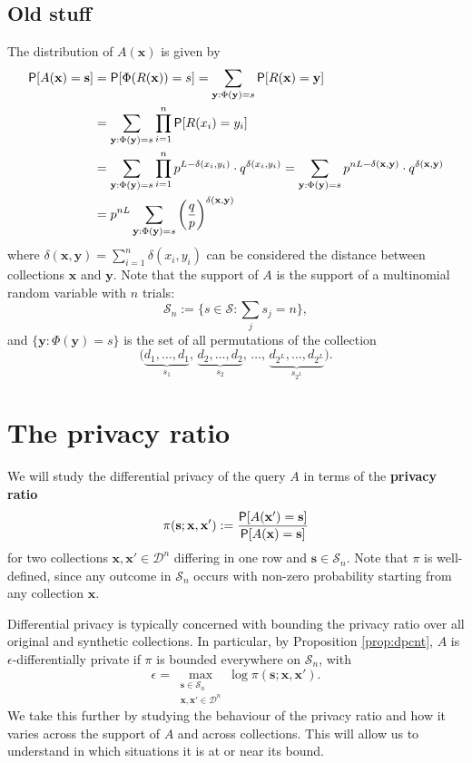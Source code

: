 \documentclass[11pt,draft]{article}
\newcommand{\Dsp}{\mathcal{D}}
\newcommand{\Ssp}{\mathcal{S}}
\newcommand{\xv}{\mathbf{x}}
\newcommand{\yv}{\mathbf{y}}
\newcommand{\sv}{\mathbf{s}}
\begin{document}
\hrulefill

\subsection{Old stuff}

The distribution of $A(\xv)$ is given by
\begin{align}
\P[A(\xv) = \sv] &= \P[\Phi(R(\xv)) = s]
= \sum_{\yv:\Phi(\yv) = s} \P[R(\xv) = \yv] \nonumber\\
&= \sum_{\yv:\Phi(\yv) = s} \prod_{i=1}^n \P[R(x_i) = y_i]
\label{eq:Adist}\\
&= \sum_{\yv:\Phi(\yv) = s} \prod_{i=1}^n p^{L - \delta(x_i,y_i)}\cdot
q^{\delta(x_i,y_i)}
= \sum_{\yv:\Phi(\yv) = s} p^{nL - \delta(\xv,\yv)}\cdot
q^{\delta(\xv,\yv)}  \nonumber \\
&= p^{nL}\sum_{\yv:\Phi(\yv) = s} \left(\frac{q}{p}\right)^{\delta(\xv,\yv)}
\end{align}
where $\delta(\xv,\yv) = \sum_{i=1}^n \delta(x_i,y_i)$ can be considered the distance between collections $\xv$ and $\yv$.
Note that the support of $A$ is the support of a multinomial random variable with $n$ trials: \[\Ssp_n := \bigg\{s \in \Ssp : \sum_j s_j = n \bigg\},\]
and $\{\yv:\Phi(\yv) = s\}$ is the set of all permutations of the collection
\[ \big(\underbrace{d_1,\dots,d_1}_{s_1},\,
   \underbrace{d_2,\dots,d_2}_{s_2},\,\dots,\,
   \underbrace{d_{2^L},\dots,d_{2^L}}_{s_{2^L}}\big).
\]


\section{The privacy ratio}

We will study the differential privacy of the query $A$ in terms of the \textbf{privacy ratio}
\[ \pi(\sv;\xv,\xv') := \frac{\P[A(\xv') = \sv]}{\P[A(\xv) = \sv]} \]
for two collections $\xv,\xv'\in\Dsp^n$ differing in one row and $\sv \in\Ssp_n$.
Note that $\pi$ is well-defined, since any outcome in $\Ssp_n$ occurs with non-zero probability starting from any collection $\xv$.

Differential privacy is typically concerned with bounding the privacy ratio over all original and synthetic collections.
In particular, by Proposition \ref{prop:dpcnt}, $A$ is $\epsilon$-differentially private if $\pi$ is bounded everywhere on $\Ssp_n$,
with
\[ \epsilon = \max_{\substack{\sv\in\Ssp_n\\ \xv,\xv' \in \Dsp^n}} \log\pi(\sv;\xv,\xv'). \]
We take this further by studying the behaviour of the privacy ratio and how it varies across the support of $A$ and across collections. This will allow us to understand in which situations it is at or near its bound.
\end{document}
